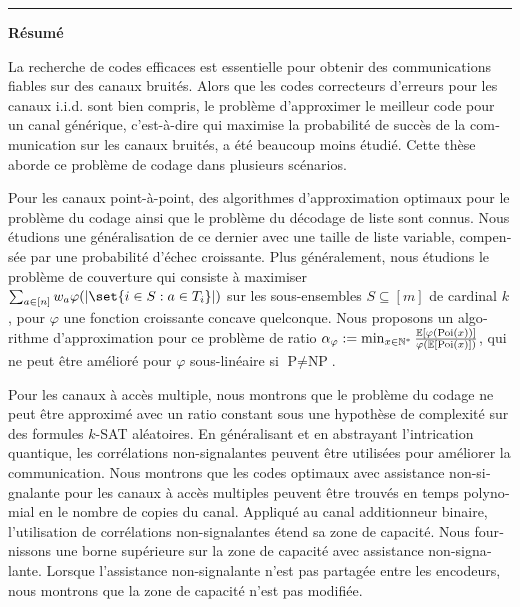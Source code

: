 \clearpage 

\flushright
\bigskip
\hrule \bigskip \bigskip
{\Huge \textbf{\textsf{Résumé}}}
\flushleftright
{}
\vspace{1.5cm}

\begin{otherlanguage}{french}
  La recherche de codes efficaces est essentielle pour obtenir des communications fiables sur des canaux bruités. Alors que les codes correcteurs d'erreurs pour les canaux i.i.d. sont bien compris, le problème d'approximer le meilleur code pour un canal générique, c'est-à-dire qui maximise la probabilité de succès de la communication sur les canaux bruités, a été beaucoup moins étudié. Cette thèse aborde ce problème de codage dans plusieurs scénarios.
  
  Pour les canaux point-à-point, des algorithmes d'approximation optimaux pour le problème du codage ainsi que le problème du décodage de liste sont connus. Nous étudions une généralisation de ce dernier avec une taille de liste variable, compensée par une probabilité d'échec croissante. Plus généralement, nous étudions le problème de couverture qui consiste à maximiser $\sum_{a \in [n]} w_a \varphi(\abs{\set{i \in S : a \in T_i}})$ sur les sous-ensembles $S \subseteq [m]$ de cardinal $k$, pour $\varphi$ une fonction croissante concave quelconque. Nous proposons un algorithme d'approximation pour ce problème de ratio $\alpha_{\varphi} := \min_{x \in \mathbb{N}^*} \frac{\mathbb{E}[\varphi(\operatorname{\text{Poi}}(x))]}{\varphi(\mathbb{E}[\operatorname{\text{Poi}}(x)])}$, qui ne peut être amélioré pour $\varphi$ sous-linéaire si $\textrm{P}\not=\textrm{NP}$.
  
  Pour les canaux à accès multiple, nous montrons que le problème du codage ne peut être approximé avec un ratio constant sous une hypothèse de complexité sur des formules $k$-SAT aléatoires. En généralisant et en abstrayant l'intrication quantique, les corrélations non-signalantes peuvent être utilisées pour améliorer la communication. Nous montrons que les codes optimaux avec assistance non-signalante pour les canaux à accès multiples peuvent être trouvés en temps polynomial en le nombre de copies du canal. Appliqué au canal additionneur binaire, l'utilisation de corrélations non-signalantes étend sa zone de capacité. Nous fournissons une borne supérieure sur la zone de capacité avec assistance non-signalante. Lorsque l'assistance non-signalante n'est pas partagée entre les encodeurs, nous montrons que la zone de capacité n'est pas modifiée.
  

\end{otherlanguage}
